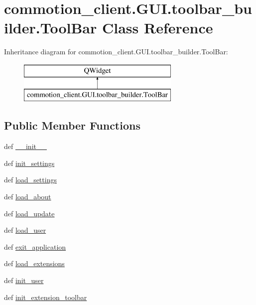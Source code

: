 \hypertarget{classcommotion__client_1_1GUI_1_1toolbar__builder_1_1ToolBar}{\section{commotion\+\_\+client.\+G\+U\+I.\+toolbar\+\_\+builder.\+Tool\+Bar Class Reference}
\label{classcommotion__client_1_1GUI_1_1toolbar__builder_1_1ToolBar}
}
Inheritance diagram for commotion\+\_\+client.\+G\+U\+I.\+toolbar\+\_\+builder.\+Tool\+Bar\+:\begin{figure}[H]
\begin{center}
\leavevmode
\includegraphics[height=2.000000cm]{classcommotion__client_1_1GUI_1_1toolbar__builder_1_1ToolBar}
\end{center}
\end{figure}
\subsection*{Public Member Functions}
\begin{DoxyCompactItemize}
\item 
def \hyperlink{classcommotion__client_1_1GUI_1_1toolbar__builder_1_1ToolBar_a86bce4db69461426435f4d6876e3e142}{\+\_\+\+\_\+init\+\_\+\+\_\+}
\item 
def \hyperlink{classcommotion__client_1_1GUI_1_1toolbar__builder_1_1ToolBar_a075b6709f65ef1aeaca34c69dd305379}{init\+\_\+settings}
\item 
def \hyperlink{classcommotion__client_1_1GUI_1_1toolbar__builder_1_1ToolBar_ab83f3bd0cdc3c0316dffaf55056c60c1}{load\+\_\+settings}
\item 
def \hyperlink{classcommotion__client_1_1GUI_1_1toolbar__builder_1_1ToolBar_a11640e9ec7f3f4dbc519824f950c6a79}{load\+\_\+about}
\item 
def \hyperlink{classcommotion__client_1_1GUI_1_1toolbar__builder_1_1ToolBar_a7d39c09c09071fba355d238cb6c1ad40}{load\+\_\+update}
\item 
def \hyperlink{classcommotion__client_1_1GUI_1_1toolbar__builder_1_1ToolBar_ad435b7c5d002f1b57e24aa7ee258085c}{load\+\_\+user}
\item 
def \hyperlink{classcommotion__client_1_1GUI_1_1toolbar__builder_1_1ToolBar_acf2126aa2356761e1112b9fa96535b44}{exit\+\_\+application}
\item 
def \hyperlink{classcommotion__client_1_1GUI_1_1toolbar__builder_1_1ToolBar_a0a0d3e80c3d039cfd2cc5d445b06b3c7}{load\+\_\+extensions}
\item 
def \hyperlink{classcommotion__client_1_1GUI_1_1toolbar__builder_1_1ToolBar_acb281187f13361c64835fa443416c8c2}{init\+\_\+user}
\item 
def \hyperlink{classcommotion__client_1_1GUI_1_1toolbar__builder_1_1ToolBar_ad033424f51c9cc7696b857b8caad00cb}{init\+\_\+extension\+\_\+toolbar}
\end{DoxyCompactItemize}
